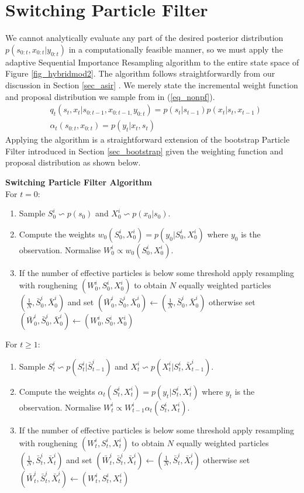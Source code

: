 \section{Switching Particle Filter}
We cannot analytically evaluate any part of the desired posterior distribution $p(s_{0:t}, x_{0:t}|y_{0:t})$ in a computationally feasible manner, so we must apply the adaptive Sequential Importance Resampling algorithm to the entire state space of Figure \ref{fig_hybridmod2}. The algorithm follows straightforwardly from our discussion in Section \ref{sec_asir} \cite{murphy1}. We merely state the incremental weight function and proposal distribution we sample from in (\ref{eq_nonpf}). 
\begin{equation}
\begin{aligned}
&q_t(s_t,x_t|s_{0:t-1},x_{0:t-1,}y_{0:t}) = p(s_t|s_{t-1})p(x_t|s_t,x_{t-1}) \\
&\alpha_t(s_{0:t},x_{0:t}) = p(y_t|x_t,s_t)
\end{aligned}
\label{eq_nonpf}
\end{equation}  
Applying the algorithm is a straightforward extension of the bootstrap Particle Filter introduced in Section \ref{sec_bootstrap} given the weighting function and proposal distribution as shown below.

\textbf{Switching Particle Filter Algorithm}\\
For $t=0$:
\begin{enumerate}
\item
Sample $S^i_0 \backsim p(s_0)$ and $X^i_0 \backsim p(x_0|s_0)$.
\item
Compute the weights $w_0(S_0^i, X_0^i) = p(y_0|S_0^i, X_0^i)$ where $y_0$ is the observation. Normalise $W^i_0 \propto w_0(S_0^i, X_0^i)$. 
\item
If the number of effective particles is below some threshold apply resampling with roughening $(W^i_0, S^i_0, X^i_0)$ to obtain $N$ equally weighted particles $(\frac{1}{N}, \bar{S}^i_0, \bar{X}^i_0)$ and set $(\bar{W}^i_0, \bar{S}^i_0,\bar{X}^i_0) \leftarrow (\frac{1}{N}, \bar{S}^i_0, \bar{X}^i_0)$ otherwise set $(\bar{W}^i_0,\bar{S}^i_0, \bar{X}^i_0) \leftarrow ({W}^i_0, S_0^i, {X}^i_0)$
\end{enumerate}
For $t \geq 1$:
\begin{enumerate}
\item
Sample $S^i_t \backsim p(S_t^i|\bar{S}^i_{t-1})$ and $X^i_t \backsim p(X^i_t|S^i_t, \bar{X}^i_{t-1})$.
\item
Compute the weights $\alpha_t(S_t^i, X_t^i) = p(y_t|S_t^i, X_t^i)$ where $y_t$ is the observation. Normalise $W^i_t \propto W^i_{t-1}\alpha_t(S_t^i, X_t^i)$.
\item
If the number of effective particles is below some threshold apply resampling with roughening $(W^i_t, S^i_t, X^i_t)$ to obtain $N$ equally weighted particles $(\frac{1}{N}, \bar{S}^i_t, \bar{X}^i_t)$ and set $(\bar{W}^i_t, \bar{S}^i_t,\bar{X}^i_t) \leftarrow (\frac{1}{N}, \bar{S}^i_t, \bar{X}^i_t)$ otherwise set $(\bar{W}^i_t,\bar{S}^i_t, \bar{X}^i_t) \leftarrow ({W}^i_t, S_t^i, {X}^i_t)$
\end{enumerate} 

